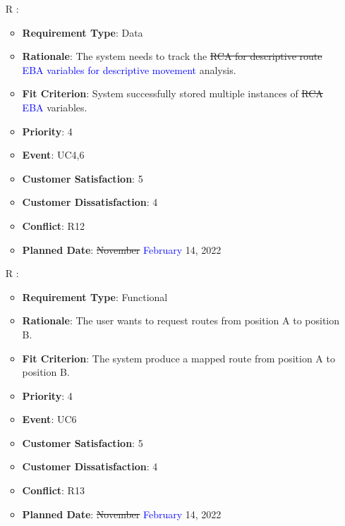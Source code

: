 \documentclass[12pt, titlepage]{article}
\newcounter{reqnum} %
\begin{document}
\begin{itemize}
\item[R\refstepcounter{reqnum}\thereqnum
\label{R_Inputs_1}:] 
\begin{itemize}
    \item \textbf{Requirement Type}: Data
    \item \textbf{Rationale}: The system needs to track the \sout{RCA for descriptive route} \textcolor{blue}{EBA variables for descriptive movement} analysis. 
    \item \textbf{Fit Criterion}: System successfully stored multiple instances of \sout{RCA} \textcolor{blue}{EBA} variables. 
    \item \textbf{Priority}: 4
    \item \textbf{Event}: UC4,6
    \item \textbf{Customer Satisfaction}: 5
    \item \textbf{Customer Dissatisfaction}: 4
    \item \textbf{Conflict}: R12
    \item \textbf{Planned Date}: \sout{November} \textcolor{blue}{February} 14, 2022
\end{itemize}

\item[R\refstepcounter{reqnum}\thereqnum
\label{R_Inputs_1}:] 
\begin{itemize}
    \item \textbf{Requirement Type}: Functional
    \item \textbf{Rationale}: The user wants to request routes from position A to position B.
    \item \textbf{Fit Criterion}: The system produce a mapped route from position A to position B.
    \item \textbf{Priority}: 4
    \item \textbf{Event}: UC6
    \item \textbf{Customer Satisfaction}: 5
    \item \textbf{Customer Dissatisfaction}: 4
    \item \textbf{Conflict}: R13
    \item \textbf{Planned Date}: \sout{November} \textcolor{blue}{February} 14, 2022
\end{itemize}


\end{itemize}
\end{document}
